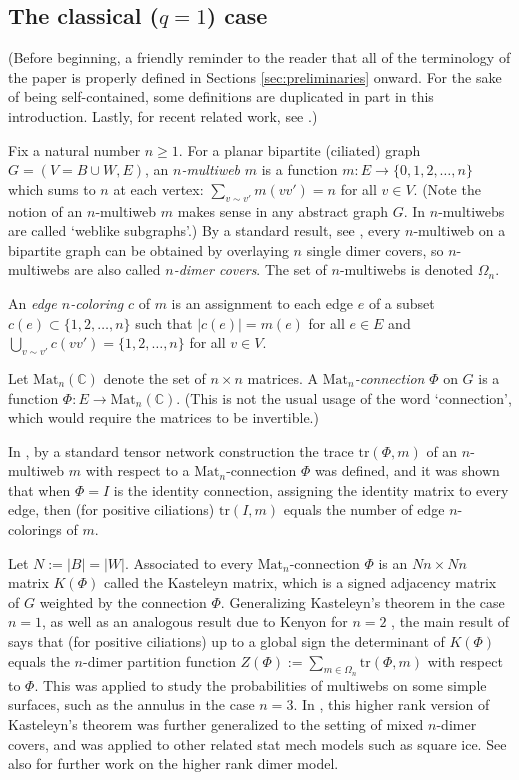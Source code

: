 \documentclass[12pt, reqno]{amsart}
\theoremstyle{definition}
\newcommand{\C}{\mathbb{C}}%
\newcommand{\Mat}{\mathrm{Mat}}%
\begin{document}
\subsection{The classical (\texorpdfstring{$q=1$}{q=1}) case}

(Before beginning, a friendly reminder to the reader that all of the terminology of the paper is properly defined in Sections \ref{sec:preliminaries} onward.  For the sake of being self-contained, some definitions are duplicated in part in this introduction.  Lastly, for recent related work, see \cite{GPPSS1, inoue2025, russell2026}.)

Fix a natural number $n\geq1$.  For a planar bipartite (ciliated) graph $G=(V=B\cup W,E)$, an \emph{$n$-multiweb} $m$ is a function $m:E\to\{0,1,2,\dots,n\}$ which sums to $n$ at each vertex: $\sum_{v\sim v'}m(vv')=n$ for all $v\in V$.  (Note the notion of an $n$-multiweb $m$ makes sense in any abstract graph $G$.  In \cite{fll19, lam15} $n$-multiwebs are called `weblike subgraphs'.)  By a standard result, see \cite{LovaszPlummer}, every $n$-multiweb on a bipartite graph can be obtained by overlaying $n$ single dimer covers, so $n$-multiwebs are also called \emph{$n$-dimer covers}. The set of $n$-multiwebs is denoted $\Omega_n$.  

An \emph{edge $n$-coloring} $c$ of $m$ is an assignment to each edge $e$ of a subset $c(e)\subset\{1,2,\dots,n\}$ such that   $|c(e)|=m(e)$ for all $e\in E$ and $\bigcup_{v\sim v'}c(vv')=\{1,2,\dots,n\}$ for all $v\in V$.  

Let $\Mat_n(\C)$ denote the set of $n\times n$ matrices. A \emph{$\Mat_n$-connection} $\Phi$ on $G$ is a function $\Phi:E\to\Mat_n(\mathbb{C})$.    (This is not the usual usage of the word `connection', which would require the matrices to be invertible.)

In \cite{DKS}, by a standard tensor network construction \cite{penrose69}     the trace $\mathrm{tr}(\Phi,m)$ of an $n$-multiweb $m$ with respect to a $\Mat_n$-connection $\Phi$ was defined, and it was shown that when $\Phi=I$ is the identity connection,   assigning the identity matrix to every edge, then (for positive ciliations) $\mathrm{tr}(I,m)$ equals the number of edge $n$-colorings of $m$.  

Let $N:=|B|=|W|$.  Associated to every $\Mat_n$-connection $\Phi$ is an $Nn\times Nn$ matrix $K(\Phi)$ called the Kasteleyn matrix,   which is a signed adjacency matrix of $G$ weighted by the connection $\Phi$.  Generalizing Kasteleyn's theorem in the case $n=1$,   as well as an analogous result due to Kenyon for $n=2$ \cite{Kenyon.double},  the main result of \cite{DKS} says that (for positive ciliations) up to a   global sign the determinant of $K(\Phi)$ equals the $n$-dimer partition function $Z(\Phi):=\sum_{m\in\Omega_n}\mathrm{tr}(\Phi,m)$ with respect to $\Phi$.    This was applied to study the probabilities of multiwebs on some simple surfaces, such as the annulus in the case $n=3$.    In \cite{KenyonOvenhouse}, this higher rank version of Kasteleyn's theorem was further generalized to the setting of mixed $n$-dimer covers,   and was applied to other related stat mech models such as square ice.   See also \cite{AEKOW} for further work on the higher rank dimer model.
\end{document}

